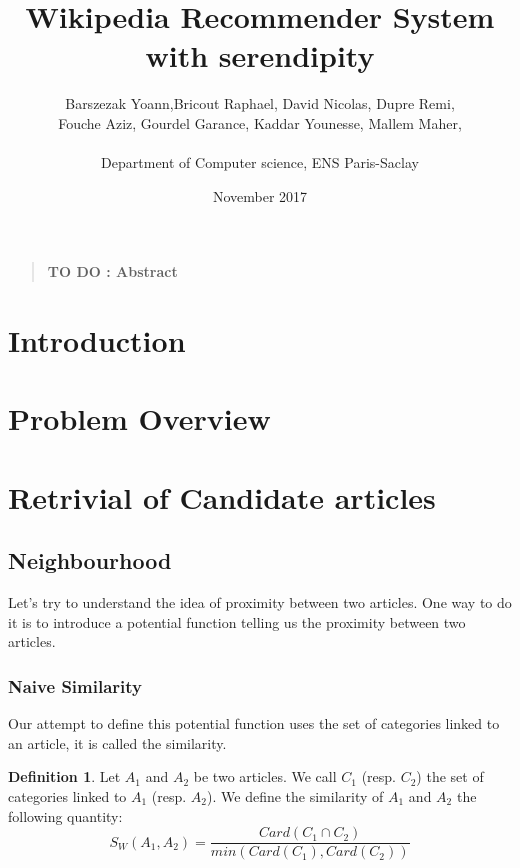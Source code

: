 \documentclass[11pt]{article}
\title{Wikipedia Recommender System with serendipity}
\author
    {
      Barszezak Yoann,Bricout Raphael, David Nicolas, Dupre Remi,\\
      Fouche Aziz, Gourdel Garance, Kaddar Younesse, Mallem Maher,\\
      \\
      \normalsize{Department of Computer science, ENS Paris-Saclay}\\
    }
\date{November 2017}
\theoremstyle{plain}
\theoremstyle{definition}
\newtheorem{defn}{Definition}[section]
\theoremstyle{remark}
\newenvironment{sciabstract}{%
\begin{quote} \bf}
{\end{quote}}
\begin{document}
 


\baselineskip10pt


\maketitle 




\begin{sciabstract}
  TO DO : Abstract
\end{sciabstract}





\section{Introduction}


\section{Problem Overview}




\section{Retrivial of Candidate articles}

\subsection{Neighbourhood}

Let's try to understand the idea of proximity between two articles. One way to do it is to introduce a potential function telling us the proximity between two articles.

\subsubsection{Naive Similarity}

Our attempt to define this potential function uses the set of categories linked to an article, it is called the similarity.





\vspace*{5mm}
\begin{defn}
  Let $A_1$ and $A_2$ be two articles. We call $C_1$ (resp. $C_2$) the set of categories linked to $A_1$ (resp. $A_2$).
  We define the similarity of $A_1$ and $A_2$ the following quantity:\\
  \begin{equation*}
    S_W(A_1,A_2) = \frac{Card(C_1 \cap C_2)}{min(Card(C_1),Card(C_2))}
  \end{equation*}
\end{defn}
\end{document}
